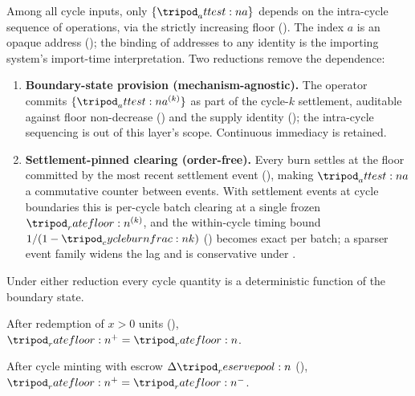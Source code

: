 \documentclass[../main.tex]{subfiles}
\begin{document}
\begin{proposition}
    \label{prop:invariants:burn-order-residual}
    Among all cycle inputs, only $\set{\attest{a}}$ depends on the intra-cycle sequence of
    operations, via the strictly increasing floor
    (). The index $a$ is an opaque address
    (); the binding of addresses to any identity is the
    importing system's import-time interpretation. Two reductions remove the dependence:
    \begin{enumerate}[nosep]
        \item \textbf{Boundary-state provision (mechanism-agnostic).} The operator commits
            $\set{\attest{a}^{(k)}}$ as part of the cycle-$k$ settlement, auditable against
            floor non-decrease () and the supply
            identity (); the intra-cycle sequencing is out of this
            layer's scope. Continuous immediacy is retained.
        \item \textbf{Settlement-pinned clearing (order-free).} Every burn settles at the
            floor committed by the most recent settlement event
            (), making $\attest{a}$ a commutative
            counter between events. With settlement events at cycle boundaries this is
            per-cycle batch clearing at a single frozen $\ratefloor{}^{(k)}$, and the
            within-cycle timing bound $1/(1-\cycleburnfrac{k})$
            () becomes exact per batch; a sparser event
            family widens the lag and is conservative under
            .
    \end{enumerate}
    Under either reduction every cycle quantity is a deterministic function of the boundary
    state.
\end{proposition}

\begin{proposition}
    \label{prop:invariants:redemption-preserves-floor}
    After redemption of $x > 0$ \liveclass{} units (),
    $\ratefloor{}^{+} = \ratefloor{}$.
\end{proposition}

\begin{proposition}
    \label{prop:invariants:issuance-preserves-floor}
    After cycle minting with escrow $\Delta\reservepool{}$
    (),
    $\ratefloor{}^{+} = \ratefloor{}^{-}$.
\end{proposition}
\end{document}
